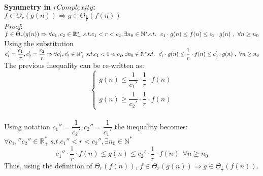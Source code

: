   \hfill\break

 \textbf{Symmetry in $rComplexity$:}  \\  $ f \in \Theta_{r}(g(n)) \Rightarrow g \in \Theta_{\frac{1}{r}}(f(n)) $
\\\textit{Proof}:
$ f \in \Theta_{r}(g(n)) \Rightarrow \forall c_{1}, c_{2} \in \mathbb{R}^{*}_{+} \ s.t.  c_{1}< r < c_{2} , \exists n_{0} \in \mathbb{N}^{*}\ \\ s.t.\ \ c_{1} \cdot g(n) \leq f(n) \leq c_{2} \cdot g(n)\ ,\  \forall n \geq n_{0} $
\\ Using the substitution $c_{1}' = \dfrac{c_{1}}{r}, c_{2}' = \dfrac{c_{2}}{r} \Rightarrow \forall c_{1}', c_{2}' \in \mathbb{R}^{*}_{+} \ s.t.  c_{1} < 1 < c_{2} , \exists n_{0} \in \mathbb{N}^{*}\ \\ s.t.\ \ c_{1}' \cdot g(n) \leq \dfrac{1}{r} \cdot f(n) \leq c_{2}' \cdot g(n)\ ,\  \forall n \geq n_{0} $
\\ The previous inequality can be re-written as: 
\[\begin{cases} g(n) \leq \dfrac{1}{c_{1}'} \cdot \dfrac{1}{r} \cdot f(n) \\ g(n) \geq \dfrac{1}{c_{2}'} \cdot \dfrac{1}{r} \cdot f(n)
 \end{cases}\]
 \\ Using notation $c_{1}'' = \dfrac{1}{c_{2}'}, c_{2}'' = \dfrac{1}{c_{1}'}$ the inequality becomes:  \\
 $\forall c_{1},'' c_{2}'' \in \mathbb{R}^{*}_{+} \ s.t.  c_{1}'' < r < c_{2}'' , \exists n_{0} \in \mathbb{N}^{*}\ $
 \[ {c_{1}''} \cdot \dfrac{1}{r} \cdot f(n) \leq g(n) \leq {c_{2}'} \cdot \dfrac{1}{r} \cdot f(n)\ \ \forall n \geq n_{0} \]
 Thus, using the definition of $ \Theta_{r}(f(n))$, $ f \in \Theta_{r}(g(n)) \Rightarrow g \in \Theta_{\frac{1}{r}}(f(n)) $.
\qedsymbol


 \hfill\break

